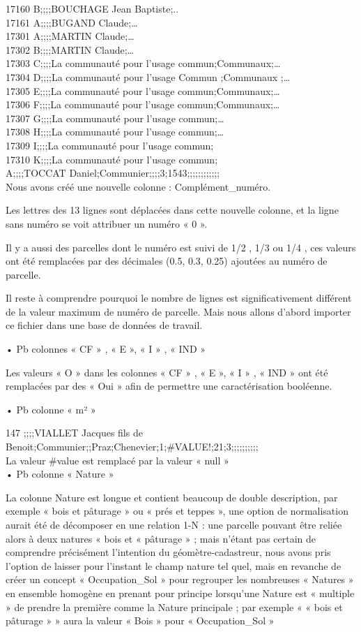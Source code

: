 \documentclass[12pt,a4paper]{report}
\begin{document}
17160 B;;;;BOUCHAGE Jean Baptiste;..\\
17161 A;;;;BUGAND Claude;… \\
17301 A;;;;MARTIN Claude;… \\
17302 B;;;;MARTIN Claude;… \\
17303 C;;;;La communauté pour l'usage commun;Communaux;… \\
17304 D;;;;La communauté pour l'usage Commun ;Communaux ;… \\
17305 E;;;;La communauté pour l'usage commun;Communaux;…\\
17306 F;;;;La communauté pour l'usage commun;Communaux;… \\
17307 G;;;;La communauté pour l'usage commun;… \\
17308 H;;;;La communauté pour l'usage commun;…\\
17309 I;;;;La communauté pour l'usage commun;\\
17310 K;;;;La communauté pour l'usage commun;\\
A;;;;TOCCAT Daniel;Communier;;;;3;1543;;;;;;;;;;;;\\

Nous avons créé une nouvelle colonne : Complément_numéro.

Les lettres des 13 lignes sont déplacées dans cette nouvelle colonne, et la ligne sans numéro se voit attribuer un numéro « 0 ».

Il y a aussi des parcelles dont le numéro est suivi de 1/2 , 1/3 ou 1/4 , ces valeurs ont été remplacées par des décimales (0.5, 0.3, 0.25) ajoutées au numéro de parcelle.

Il reste à comprendre pourquoi le nombre de lignes est significativement différent de la valeur maximum de numéro de parcelle. Mais nous allons d’abord importer ce fichier dans une base de données de travail.

•	Pb colonnes « CF » , « E », « I » , « IND »

Les valeurs « O » dans les colonnes « CF » , « E », « I » , « IND » ont été remplacées par des « Oui » afin de permettre une caractérisation booléenne.

•	Pb colonne « m² »

147 ;;;;VIALLET Jacques fils de Benoit;Communier;;Praz;Chenevier;1;\#VALUE!;21;3;;;;;;;;;;\\
La valeur \#value est remplacé par la valeur « null » \\
•	Pb colonne « Nature »

La colonne Nature est longue et contient beaucoup de double description, par exemple « bois et pâturage » ou « prés et teppes », une option de normalisation aurait été de décomposer en une relation 1-N : une parcelle pouvant être reliée alors à deux natures « bois et « pâturage » ; mais n’étant pas certain de comprendre précisément l’intention du géomètre-cadastreur, nous avons pris l’option de laisser pour l’instant le champ nature tel quel, mais en revanche de créer un concept « Occupation_Sol » pour regrouper les nombreuses « Natures » en ensemble homogène en prenant pour principe lorsqu’une Nature est « multiple » de prendre la première comme la Nature principale ; par exemple « « bois et pâturage » » aura la valeur « Bois » pour « Occupation_Sol »
\end{document}
